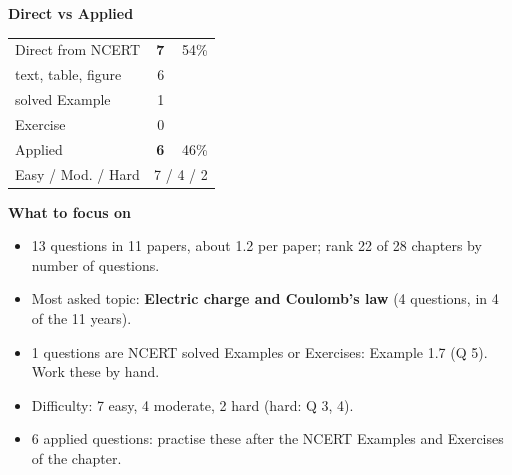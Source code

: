 \begin{minipage}[t]{0.34\linewidth}{\small\textbf{\color{crimson}Direct vs Applied}\par\smallskip
\begin{tabular}{@{}lrr@{}}\toprule
Direct from NCERT & \textbf{7} & 54\%\\
\quad text, table, figure & 6 &\\
\quad solved Example & 1 &\\
\quad Exercise & 0 &\\
Applied & \textbf{6} & 46\%\\\midrule
Easy / Mod. / Hard & \multicolumn{2}{r}{7 / 4 / 2}\\\bottomrule
\end{tabular}}\end{minipage}\hfill
\begin{minipage}[t]{0.63\linewidth}{\small\textbf{\color{crimson}What to focus on}\par\smallskip
\begin{itemize}[leftmargin=1.1em,itemsep=1pt,topsep=0pt]
\item 13 questions in 11 papers, about 1.2 per paper; rank 22 of 28 chapters by number of questions.
\item Most asked topic: \textbf{Electric charge and Coulomb's law} (4 questions, in 4 of the 11 years).
\item 1 questions are NCERT solved Examples or Exercises: Example 1.7 (Q 5). Work these by hand.
\item Difficulty: 7 easy, 4 moderate, 2 hard (hard: Q 3, 4).
\item 6 applied questions: practise these after the NCERT Examples and Exercises of the chapter.
\end{itemize}}\end{minipage}\par
{}
